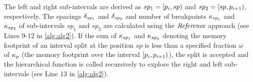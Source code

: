 The left and right sub-intervals are derived as $sp_1=[p_{i},sp)$ and $sp_2=[sp,p_{i+1})$, respectively.
The spacings $\delta_{sp_1}$ and $\delta_{sp_2}$ and number of breakpoints $\kappa_{sp_1}$ and $\kappa_{sp_2}$ of sub-intervals $sp_1$ and $sp_2$ are calculated using the $\textit{Reference}$ approach (see Lines 9-12 in \cref{alg:alg2}). 
If the sum of $\kappa_{sp_1}$ and $\kappa_{sp_2}$ denoting the memory footprint of an interval split at the position $sp$ is less than a specified fraction $\ReductionThreshold$ of $\kappa_{p}$ (the memory footprint over the interval $[p_{i},p_{i+1})$), the split is accepted and the hierarchical function is called recursively to explore the right and left sub-intervals (see Line 13 in \cref{alg:alg2}).
\begin{algorithm}[t!]
	\small
	\SetAlgoLined
	\Fn{\FMain{$\ReductionThreshold$,$\AbsError$,$f$,$\Partition{i}$,$\Partition{i+1}$}}{
			\KwIn{$f$ is the function to be approximated\\
			\hspace{10mm}$\Partition{i}$ is the lower bound of the interval\\
			\hspace{10mm}$\Partition{i+1}$ is the upper bound of the interval\\
			\hspace{10mm}$\ReductionThreshold$ is the reduction threshold (0,1] \\
			\hspace{10mm}$\AbsError$ is the maximum approximation error\\
			\hspace{10mm}$\StepSize$ is the sweep step size\\
		}
		\KwOut{$\SetPartitions=\{\Partition{0}, \Partition{1}, \ldots, \Partition{n}  \}$ is set of sub-interval boundaries\\
			
		}
		\Begin{
			
}}
\end{algorithm}
